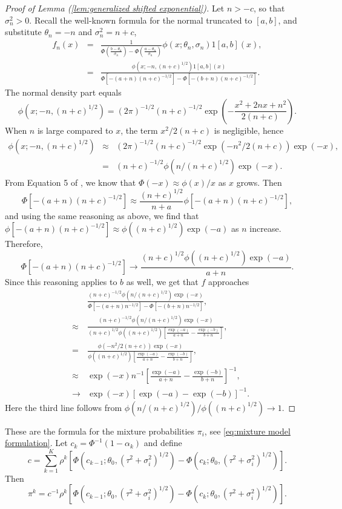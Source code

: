 \documentclass[article]{ajs}
\numberwithin{equation}{section}
\numberwithin{figure}{section}
\theoremstyle{plain}
\theoremstyle{definition}
\theoremstyle{definition}
\theoremstyle{plain}
\begin{document}
\begin{proof}[Proof of Lemma (\ref{lem:generalized shifted exponential})]
\label{proof:generalized shifted exponential}Let $n>-c$, so
that $\sigma_{n}^{2}>0$. Recall the well-known formula for the normal
truncated to $[a,b]$, and substitute $\theta_n = -n$ and $\sigma^2_n = n + c$,
\begin{eqnarray}
f_{n}(x) & = & \frac{1}{\Phi\left(\frac{b-\theta_{n}}{\sigma_{n}}\right)-\Phi\left(\frac{a-\theta_{n}}{\sigma_{n}}\right)}\phi(x;\theta_{n},\sigma_{n})1[a,b](x),\label{eq:truncated}\\
 & = & \frac{\phi(x;-n,(n+c)^{1/2})1[a,b](x)}{\Phi[-(a+n)(n+c)^{-1/2}]-\Phi[-(b+n)(n+c)^{-1/2}]}.\nonumber 
\end{eqnarray}
The normal density part equals
\[
\phi(x;-n,(n+c)^{1/2})=(2\pi)^{-1/2}(n+c)^{-1/2}\exp\left(-\frac{x^{2}+2nx+n^{2}}{2(n+c)}\right).
\]
When $n$ is large compared to $x$, the term $x^{2}/2(n+c)$ is negligible,
hence
\begin{eqnarray*}
\phi(x;-n,(n+c)^{1/2}) & \approx & (2\pi)^{-1/2}(n+c)^{-1/2}\exp(-n^{2}/2(n+c))\exp(-x),\\
 & = & (n+c)^{-1/2}\phi(n/(n+c)^{1/2})\exp(-x).
\end{eqnarray*}
From Equation 5 of \citet{borjesson1979simple}, we know that $\Phi(-x)\approx\phi(x)/x$
as $x$ grows. Then
\begin{equation*}
\Phi[-(a+n)(n+c)^{-1/2}] \approx \frac{(n+c)^{1/2}}{n+a}\phi[-(a+n)(n+c)^{-1/2}],
\end{equation*}
and using the same reasoning as above, we find that $\phi[-(a+n)(n+c)^{-1/2}]\approx\phi((n+c)^{1/2})\exp(-a)$
as $n$ increase. Therefore,
\[
\Phi[-(a+n)(n+c)^{-1/2}]\to\frac{(n+c)^{1/2}\phi((n+c)^{1/2})\exp(-a)}{a+n}.
\]
Since this reasoning applies to $b$ as well, we get that $f$ approaches
\begin{eqnarray*}
 &  & \frac{(n+c)^{-1/2}\phi(n/(n+c)^{1/2})\exp(-x)}{\Phi[-(a+n)n^{-1/2}]-\Phi[-(b+n)n^{-1/2}]},\\
 & \approx & \frac{(n+c)^{-1/2}\phi(n/(n+c)^{1/2})\exp(-x)}{(n+c)^{1/2}\phi((n+c)^{1/2})\left[\frac{\exp(-a)}{a+n}-\frac{\exp(-b)}{b+n}\right]},\\
 & = & \frac{\phi(-n^{2}/2(n+c))\exp(-x)}{\phi((n+c)^{1/2})\left[\frac{\exp(-a)}{a+n}-\frac{\exp(-b)}{b+n}\right]},\\
 & \approx & \exp(-x)n^{-1}\left[\frac{\exp(-a)}{a+n}-\frac{\exp(-b)}{b+n}\right]^{-1},\\
 & \to & \exp(-x)\left[\exp(-a)-\exp(-b)\right]^{-1}.
\end{eqnarray*}
Here the third line follows from $\phi(n/(n+c)^{1/2})/\phi((n+c)^{1/2})\to1$.
\end{proof}
These are the formula for the mixture probabilities
$\pi_{i}$, see \eqref{eq:mixture model formulation}. Let $c_{k}=\Phi^{-1}(1-\alpha_{k})$ and define 
\[
c=\sum_{k=1}^{K}\rho^{k}[\Phi(c_{k-1};\theta_{0},(\tau^{2}+\sigma_{i}^{2})^{1/2})-\Phi(c_{k};\theta_{0},(\tau^{2}+\sigma_{i}^{2})^{1/2})].
\]
Then \label{eq:pi_i formula}
\[
\pi^{k}=c^{-1}\rho^{k}[\Phi(c_{k-1};\theta_{0},(\tau^{2}+\sigma_{i}^{2})^{1/2})-\Phi(c_{k};\theta_{0},(\tau^{2}+\sigma_{i}^{2})^{1/2})].
\]


\end{document}
